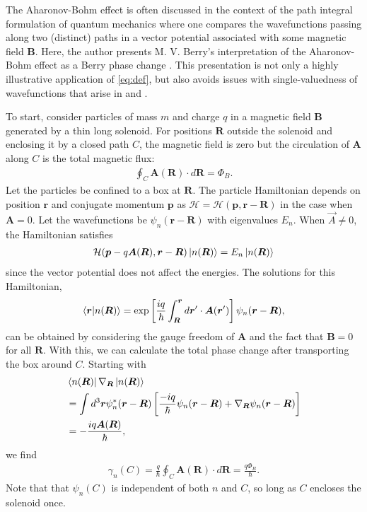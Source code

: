 \documentclass[reprint,
nofootinbib,
amsmath,amssymb,
aps]{revtex4-1}
\newcommand{\f}[2]{\frac{#1}{#2}}
\newcommand{\lb}{\left[}
\newcommand{\rb}{\right]}
\begin{document}
The Aharonov-Bohm effect is often discussed in the context of the path integral formulation of quantum mechanics where one compares the wavefunctions passing along two (distinct) paths in a vector potential associated with some magnetic field $\bm{B}$.  Here, the author presents M. V. Berry's interpretation of the Aharonov-Bohm effect as a Berry phase change \cite{berry1984quantal}. This presentation is not only a highly illustrative application of \eqref{eq:def}, but also avoids issues with single-valuedness of wavefunctions that arise in \cite{aharonov1959significance} and \cite{ehrenberg1949refractive}. 


To start, consider particles of mass $m$ and charge $q$ in a magnetic field $\bm{B}$ generated by a thin long solenoid. For positions $\bm{R}$ outside the solenoid and enclosing it by a closed path $C$, the magnetic field is zero but the circulation of $\bm{A}$ along $C$ is the total magnetic flux:
\begin{align*}
\oint_C \bm{A}(\bm{R}) \cdot d\bm{R} = \Phi_B.
\end{align*}
Let the particles be confined to a box at $\bm{R}$. The particle Hamiltonian depends on position ${\bm{r}}$ and conjugate momentum $\bm{p}$ as $\mathcal{H} = \mathcal{H}(\bm{p}, \bm{r} - \bm{R})$ in the case when $\bm{A} = 0$. Let the wavefunctions be $\psi_n(\bm{r} - \bm{R})$ with eigenvalues $E_n$.  When $\vec{A} \neq 0$, the Hamiltonian satisfies
\begin{align*}
\mathcal{H}(\bm{p}-q\bm{A}(\bm{R}), \bm{r}- \bm{R}) \ket{n(\bm{R})} = E_n \ket{n(\bm{R})}
\end{align*}
since the vector potential does not affect the energies. The solutions for this Hamiltonian,
\begin{align*}
\bra{\bm{r}} \ket{n(\bm{R})} = \exp\lb \f{iq}{\hbar} \int_{\bm{R}}^{\bm{r}} d\bm{r}'\cdot \bm{A}(\bm{r}') \rb \psi_n(\bm{r} - \bm{R}),
\end{align*}
can be obtained by considering the gauge freedom of $\bm{A}$ and the fact that $\bm{B}=0$ for all $\bm{R}$. With this, we can calculate the total phase change after transporting the box around $C$. Starting with
\begin{align*}
&\bra{n(\bm{R})} \nabla_{\bm{R}} \ket{n(\bm{R})}\\
&= \int d^3\bm{r}\psi^*_n(\bm{r} - \bm{R}) \lb \f{-iq}{\hbar}\psi_n(\bm{r} - \bm{R}) + \nabla_{\bm{R}} \psi_n(\bm{r} - \bm{R}) \rb\\
&= -\f{iq\bm{A}(\bm{R})}{\hbar},
\end{align*}
we find 
\begin{align*}
\gamma_n(C) = \f{q}{\hbar}\oint_C \bm{A}(\bm{R}) \cdot d\bm{R} = \f{q\Phi_B}{\hbar}.
\end{align*}
Note that that $\psi_n(C)$ is independent of both $n$ and $C$, so long as $C$ encloses the solenoid once.
\end{document}
